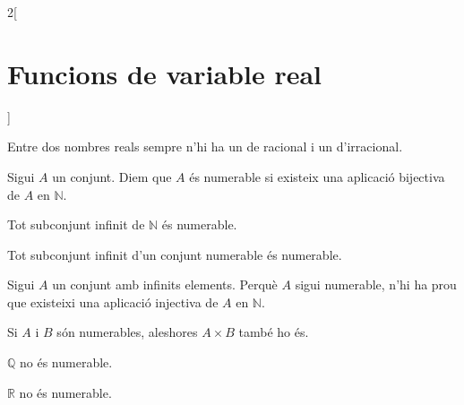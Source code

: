 \documentclass[class=article,10pt,crop=false]{standalone}
\begin{document}
\begin{multicols}{2}[\section{Funcions de variable real}]
\begin{prop}
Entre dos nombres reals sempre n'hi ha un de racional i un d'irracional.
\end{prop}
\begin{definition}
Sigui $A$ un conjunt. Diem que $A$ és numerable si existeix una aplicació bijectiva de $A$ en $\mathbb{N}$.
\end{definition}
\begin{prop}
Tot subconjunt infinit de $\mathbb{N}$ és numerable.
\end{prop}
\begin{corollary}
Tot subconjunt infinit d’un conjunt numerable és numerable.
\end{corollary}
\begin{corollary}
Sigui $A$ un conjunt amb infinits elements. Perquè $A$ sigui numerable,
n'hi ha prou que existeixi una aplicació injectiva de $A$ en $\mathbb{N}$.
\end{corollary}
\begin{prop}
Si $A$ i $B$ són numerables, aleshores $A\times B$ també ho és.
\end{prop}
\begin{theorem}
$\mathbb{Q}$ no és numerable.
\end{theorem}
\begin{theorem}
$\mathbb{R}$ no és numerable.
\end{theorem}

\end{multicols}
\end{document}
